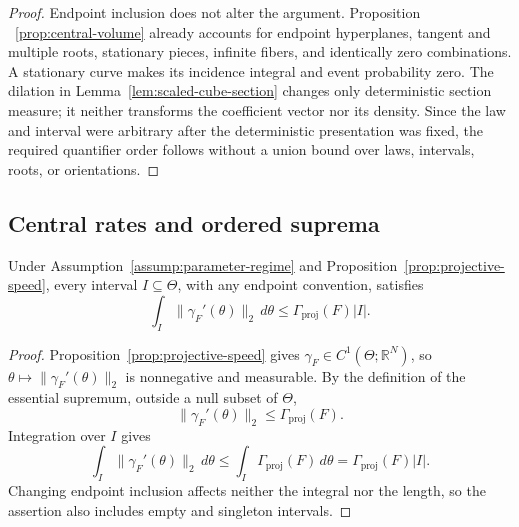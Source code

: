 \begin{proof}
Endpoint inclusion does not alter the argument.  Proposition
~\ref{prop:central-volume} already accounts for endpoint hyperplanes, tangent
and multiple roots, stationary pieces, infinite fibers, and identically zero
combinations.  A stationary curve makes its incidence integral and event
probability zero.  The dilation in Lemma~\ref{lem:scaled-cube-section}
changes only deterministic section measure; it neither transforms the
coefficient vector nor its density.  Since the law and interval were
arbitrary after the deterministic presentation was fixed, the required
quantifier order follows without a union bound over laws, intervals, roots,
or orientations.
\end{proof}

\subsection{Central rates and ordered suprema}
\label{app:central-rate}

\begin{lemma}
\label{lem:speed-length}
Under Assumption~\ref{assump:parameter-regime} and
Proposition~\ref{prop:projective-speed}, every interval
$I\subseteq\Theta$, with any endpoint convention, satisfies
\[
\int_I\|\gamma_F'(\theta)\|_2\,d\theta
\leq\Gamma_{\mathrm{proj}}(F)|I|.
\tag{A.14}
\]
\end{lemma}

\begin{proof}
Proposition~\ref{prop:projective-speed} gives
$\gamma_F\in C^1(\Theta;\mathbb R^N)$, so
$\theta\mapsto\|\gamma_F'(\theta)\|_2$ is nonnegative and measurable.  By
the definition of the essential supremum, outside a null subset of $\Theta$,
\[
\|\gamma_F'(\theta)\|_2\leq\Gamma_{\mathrm{proj}}(F).
\]
Integration over $I$ gives
\[
\int_I\|\gamma_F'(\theta)\|_2\,d\theta
\leq\int_I\Gamma_{\mathrm{proj}}(F)\,d\theta
=\Gamma_{\mathrm{proj}}(F)|I|.
\]
Changing endpoint inclusion affects neither the integral nor the length, so
the assertion also includes empty and singleton intervals.
\end{proof}

